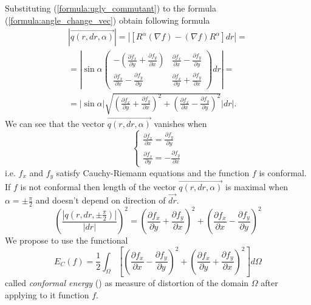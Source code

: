 \documentclass{article}
\newcommand{\vect}{\overrightarrow}
\begin{document}
Substituting (\ref{formula:ugly_commutant}) to the formula (\ref{formula:angle_change_vec}) obtain following formula
\begin{multline*} 
  \left| \vect{q(r, dr, \alpha)} \right| = \left| \left[R^\alpha (\nabla f) - (\nabla f) R^\alpha \right] dr \right| = \\
  = \left| \sin \alpha \begin{pmatrix}
    -(\frac{\partial f_x}{\partial y} + \frac{\partial f_y}{\partial x}) &
    \frac{\partial f_x}{\partial x} - \frac{\partial f_y}{\partial y} \\
    \frac{\partial f_x}{\partial x} - \frac{\partial f_y}{\partial y} &
    \frac{\partial f_x}{\partial y} + \frac{\partial f_y}{\partial x} 
  \end{pmatrix} dr \right| = \\
  = |\sin \alpha| \sqrt{\left(\frac{\partial f_x}{\partial y} + \frac{\partial f_y}{\partial x}\right)^2 + \left(\frac{\partial f_x}{\partial x} - \frac{\partial f_y}{\partial y}\right)^2} \left| dr \right|.
\end{multline*}
We can see that the vector $\vect{q(r, dr, \alpha)}$ vanishes when 
$$\begin{cases}
  \frac{\partial f_x}{\partial x} = \frac{\partial f_y}{\partial y} \\
  \frac{\partial f_x}{\partial y} = -\frac{\partial f_y}{\partial x} 
\end{cases}$$
i.e. $f_x$ and $f_y$ satisfy Cauchy-Riemann equations and the function $f$ is conformal. If $f$ is not conformal then length of 
the vector $\vect{q(r, dr, \alpha)}$ is maximal when $\alpha = \pm \frac{\pi}{2}$ and doesn't depend on direction of $\vect{dr}$. 
\begin{equation*}
  \left(\frac{\left| {q(r, dr, \pm \frac{\pi}{2})} \right|}{|dr|}\right)^2 = 
  \left(\frac{\partial f_x}{\partial y} + \frac{\partial f_y}{\partial x}\right)^2 + 
  \left(\frac{\partial f_x}{\partial x} - \frac{\partial f_y}{\partial y}\right)^2 
\end{equation*}
We propose to use the functional 
\begin{equation*}
  E_C(f) = \frac{1}{2} \int_{\Omega}\left[{ \left(\frac{\partial f_x}{\partial x} - \frac{\partial f_y}{\partial y}\right)^2 + 
                                            \left(\frac{\partial f_x}{\partial y} + \frac{\partial f_y}{\partial x}\right)^2} \right] d\Omega   
\end{equation*}
called \textit{conformal energy} (\cite{Polthier}) as measure of distortion of the domain $\Omega$ after applying to it function $f$.
\end{document}
